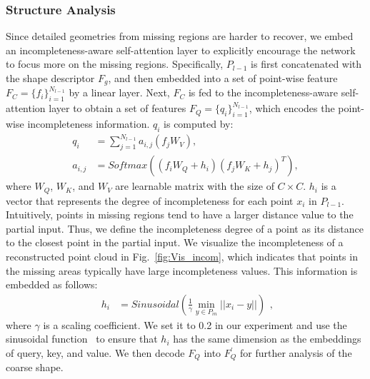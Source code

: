 \subsubsection{Structure Analysis}
Since detailed geometries from missing regions are harder to recover, we embed an incompleteness-aware self-attention layer to explicitly encourage the network to focus more on the missing regions. Specifically, $P_{l-1}$ is first concatenated with the shape descriptor $F_g$, and then embedded into a set of point-wise feature $F_C=\{f_i\}^{N_{l-1}}_{i=1}$ by a linear layer. 
Next, $F_C$ is fed to the incompleteness-aware self-attention layer to obtain a set of features $F_Q=\{q_i\}^{N_{l-1}}_{i=1}$, which encodes the point-wise incompleteness information. 
$q_i$ is computed by:
\begin{equation} \label{eqn1}
  \begin{split}
   q_i &= \sum_{j=1}^{N_{l-1}}{a_{i,j}(f_jW_V)},\\
   a_{i,j} &= Softmax((f_iW_Q+h_i)(f_jW_K+h_j)^T),
  \end{split}
\end{equation}
where $W_Q$, $W_K$, and $W_V$ are learnable matrix with the size of $C \times C$. $h_i$ is a vector that represents the degree of incompleteness for each point $x_i$ in $P_{l-1}$. 
Intuitively, points in missing regions tend to have a larger distance value to the partial input. 
Thus, we define the incompleteness degree of a point as its distance to the closest point in the partial input. We visualize the incompleteness of a reconstructed point cloud in Fig.~\ref{fig:Vis_incom}, which indicates that points in the missing areas typically have large incompleteness values. This information is embedded as follows:
\begin{equation} \label{eqn2}
  \begin{split}
   h_i &= Sinusoidal(\frac{1}{\gamma}\min_{y \in P_{in}}\lvert \lvert x_i - y \lvert\lvert)
  \end{split},
\end{equation}
where $\gamma$ is a scaling coefficient. We set it to 0.2 in our experiment and use the sinusoidal function~\citep{vaswani2017attention} to ensure that $h_i$ has the same dimension as the embeddings of query, key, and value. We then decode $F_Q$ into $F_{Q}^{\prime}$ for further analysis of the coarse shape.

